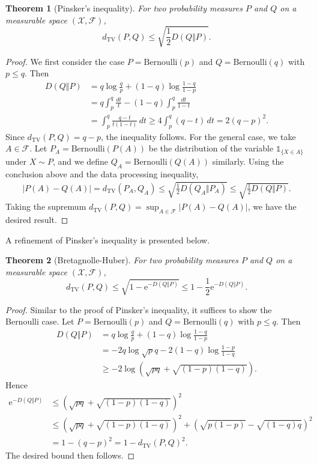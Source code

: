 \documentclass{article}
\numberwithin{equation}{section}
\newcommand{\e}{\mathrm{e}}
\newcommand{\scr}{\mathscr}
\theoremstyle{plain}
\newtheorem{theorem}{Theorem}[section]
\theoremstyle{definition}
\begin{document}
\begin{theorem}[Pinsker's inequality] 
For two probability measures $P$ and $Q$ on a measurable space $(\mathcal{X},\mathscr{F})$,
\begin{equation*}
	d_{\mathrm{TV}}(P,Q) \leq \sqrt{\frac{1}{2}D(Q\Vert P)}.\label{eq:3.18}
\end{equation*}
\end{theorem}
\begin{proof}
We first consider the case $P=\mathrm{Bernoulli}(p)$ and $Q=\mathrm{Bernoulli}(q)$ with $p\leq q$. Then
\begin{align*}
	D(Q\Vert P)&=q\log\frac{q}{p}+(1-q)\log\frac{1-q}{1-p}\\
	&=q\int_p^q\frac{dt}{t}-(1-q)\int_p^q\frac{dt}{1-t}\\
	&=\int_p^q\frac{q-t}{t(1-t)}\,dt\geq 4\int_p^q(q-t)\,dt=2(q-p)^2.
\end{align*}
Since $d_\mathrm{TV}(P,Q)=q-p$, the inequality follows. For the general case, we take $A\in\mathscr{F}$. Let $P_A=\mathrm{Bernoulli}(P(A))$ be the distribution of the variable $\mathds{1}_{\{X\in A\}}$ under $X\sim P$, and we define $Q_A=\mathrm{Bernoulli}(Q(A))$ similarly. Using the conclusion above and the data processing inequality,
\begin{align*} 
	\vert P(A)-Q(A)\vert = d_{\mathrm{TV}}(P_A,Q_A)\leq\sqrt{\frac{1}{2}D(Q_A\Vert P_A)}\leq\sqrt{\frac{1}{2}D(Q\Vert P)}.
\end{align*}
Taking the supremum $d_\mathrm{TV}(P,Q)=\sup_{A\in\scr{F}}\vert P(A)-Q(A)\vert$, we have the desired result.
\end{proof}

A refinement of Pinsker's inequality is presented below.
\begin{theorem}[Bretagnolle-Huber] 
For two probability measures $P$ and $Q$ on a measurable space $(\mathcal{X},\mathscr{F})$,
\begin{equation*}
	d_{\mathrm{TV}}(P,Q) \leq \sqrt{1 - \e^{-D(Q\Vert P)}} \leq 1 - \frac{1}{2} \e^{-D(Q\Vert P)}.
\end{equation*}
\end{theorem}
\begin{proof}
Similar to the proof of Pinsker's inequality, it suffices to show the Bernoulli case. Let $P=\mathrm{Bernoulli}(p)$ and $Q=\mathrm{Bernoulli}(q)$ with $p\leq q$. Then
\begin{align*}
	D(Q\Vert P)&=q\log\frac{q}{p}+(1-q)\log\frac{1-q}{1-p}\\
	&=-2q\log\sqrt{p}{q}-2(1-q)\log\frac{1-p}{1-q}\\
	&\geq -2\log\left(\sqrt{pq}+\sqrt{(1-p)(1-q)}\right).
\end{align*}
Hence
\begin{align*}
	\e^{-D(Q\Vert P)}&\leq \left(\sqrt{pq}+\sqrt{(1-p)(1-q)}\right)^2\\
	&\leq \left(\sqrt{pq}+\sqrt{(1-p)(1-q)}\right)^2+\left(\sqrt{p(1-p)}-\sqrt{(1-q)q}\right)^2\\
	&=1-(q-p)^2=1-d_\mathrm{TV}(P,Q)^2.
\end{align*}
The desired bound then follows.
\end{proof}
\end{document}

